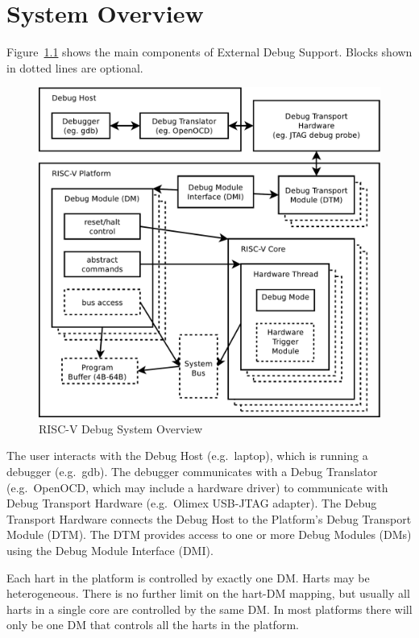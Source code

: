 \chapter{System Overview} \label{overview}

Figure~\ref{fig:overview} shows the main components of External Debug Support.
Blocks shown in dotted lines are optional. 

\begin{figure}
   \centering
   \includegraphics[width=\textwidth]{fig/overview-eps-converted-to.pdf}
   \caption{RISC-V Debug System Overview}
   \label{fig:overview}
\end{figure}

The user interacts with the Debug Host (e.g.\ laptop), which is running a
debugger (e.g.\ gdb).  The debugger communicates with a Debug Translator (e.g.\ 
OpenOCD, which may include a hardware driver) to communicate with Debug
Transport Hardware (e.g.\ Olimex USB-JTAG adapter).
The Debug Transport Hardware connects the Debug Host to the Platform's Debug
Transport Module (DTM).  The DTM provides access to one or more Debug Modules
(DMs) using the Debug Module Interface (DMI).

Each hart in the platform is controlled by exactly one DM. Harts may be
heterogeneous. There is no further limit on the hart-DM mapping, but usually
all harts in a single core are controlled by the same DM. In most platforms there
will only be one DM that controls all the harts in the platform.

